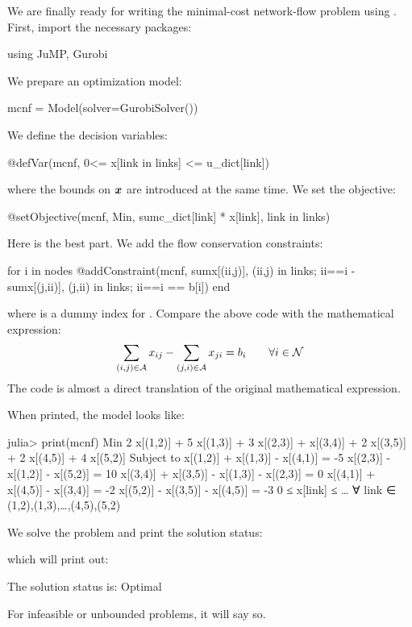 We are finally ready for writing the minimal-cost network-flow problem using \jump{}. First, import the necessary packages:
\begin{code}
using JuMP, Gurobi
\end{code}
\noindent We prepare an optimization model:
\begin{code}
mcnf = Model(solver=GurobiSolver())
\end{code}
\noindent We define the decision variables:
\begin{code}
@defVar(mcnf, 0<= x[link in links] <= u_dict[link])
\end{code}
\noindent where the bounds on $\boldsymbol{x}$ are introduced at the same time. We set the objective:
\begin{code}
@setObjective(mcnf, Min, sum{c_dict[link] * x[link], link in links})
\end{code}
\noindent Here is the best part. We add the flow conservation constraints:
\begin{code}
for i in nodes
   @addConstraint(mcnf, sum{x[(ii,j)], (ii,j) in links; ii==i}
                      - sum{x[(j,ii)], (j,ii) in links; ii==i} == b[i])
end
\end{code}
\noindent where  is a dummy index for . Compare the above code with the mathematical expression:
\[
	\sum_{(i,j)\in\mathcal{A}} x_{ij} - \sum_{(j,i)\in\mathcal{A}} x_{ji} = b_i \qquad \forall i\in\mathcal{N}
\]
The \julia{} code is almost a direct translation of the original mathematical expression.

When printed, the model looks like:
\begin{code}
julia> print(mcnf)
Min 2 x[(1,2)] + 5 x[(1,3)] + 3 x[(2,3)] + x[(3,4)]
+ 2 x[(3,5)] + 2 x[(4,5)] + 4 x[(5,2)]
Subject to
 x[(1,2)] + x[(1,3)] - x[(4,1)] = -5
 x[(2,3)] - x[(1,2)] - x[(5,2)] = 10
 x[(3,4)] + x[(3,5)] - x[(1,3)] - x[(2,3)] = 0
 x[(4,1)] + x[(4,5)] - x[(3,4)] = -2
 x[(5,2)] - x[(3,5)] - x[(4,5)] = -3
 0 ≤ x[link] ≤ … ∀ link ∈ {(1,2),(1,3),…,(4,5),(5,2)}
\end{code}

We solve the problem and print the solution status:
\noindent which will print out:
\begin{code}
The solution status is: Optimal
\end{code}
\noindent For infeasible or unbounded problems, it will say so.

